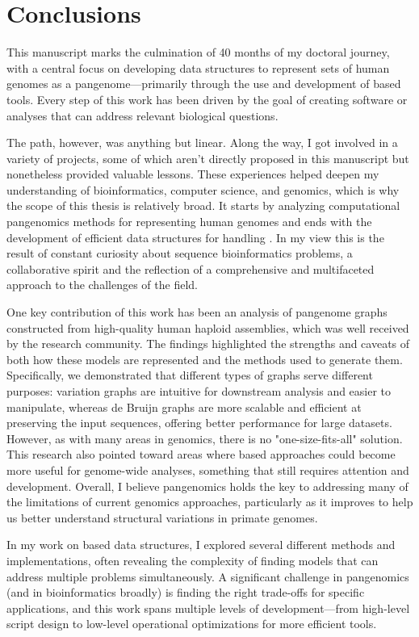 \chapter{Conclusions}
\label{sec:conclusions}
This manuscript marks the culmination of 40 months of my doctoral journey, with a central focus on developing data structures to represent sets of human genomes as a pangenome—primarily through the use and development of \kmer based tools. Every step of this work has been driven by the goal of creating software or analyses that can address relevant biological questions.

The path, however, was anything but linear. Along the way, I got involved in a variety of projects, some of which aren’t directly proposed in this manuscript but nonetheless provided valuable lessons. These experiences helped deepen my understanding of bioinformatics, computer science, and genomics, which is why the scope of this thesis is relatively broad. It starts by analyzing computational pangenomics methods for representing human genomes and ends with the development of efficient data structures for handling \kmers. In my view this is the result of constant curiosity about sequence bioinformatics problems, a collaborative spirit and the reflection of a comprehensive and multifaceted approach to the challenges of the field.

One key contribution of this work has been an analysis of pangenome graphs constructed from high-quality human haploid assemblies, which was well received by the research community. The findings highlighted the strengths and caveats of both how these models are represented and the methods used to generate them. Specifically, we demonstrated that different types of graphs serve different purposes: variation graphs are intuitive for downstream analysis and easier to manipulate, whereas de Bruijn graphs are more scalable and efficient at preserving the input sequences, offering better performance for large datasets. However, as with many areas in genomics, there is no "one-size-fits-all" solution. This research also pointed toward areas where \kmer based approaches could become more useful for genome-wide analyses, something that still requires attention and development. Overall, I believe pangenomics holds the key to addressing many of the limitations of current genomics approaches, particularly as it improves to help us better understand structural variations in primate genomes.

In my work on \kmer based data structures, I explored several different methods and implementations, often revealing the complexity of finding models that can address multiple problems simultaneously. A significant challenge in pangenomics (and in bioinformatics broadly) is finding the right trade-offs for specific applications, and this work spans multiple levels of development—from high-level script design to low-level operational optimizations for more efficient tools.

